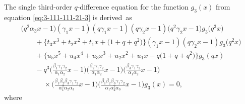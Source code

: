 \documentclass[pdftex]{sigma}
\numberwithin{equation}{section}
\theoremstyle{definition}
\begin{document}
The single third-order $q$-difference equation for the function $g_3(x)$ from equation \eqref{eq:3-111-111-21-3} is derived~as
\begin{gather}
\bigl(q^2 \alpha_3 x-1\bigr)(\gamma_1 x-1)(q \gamma_1 x-1)(q \gamma_2 x-1)\bigl(q^2 \gamma_2 x-1\bigr)g_3\bigl(q^3x\bigr) \nonumber \\
\qquad{}+ \bigl\{ t_3 x^3 + t_2 x^2 + t_1 x +\bigl(1+q+q^2\bigr) \bigr\} (\gamma_1 x-1)(q \gamma_2 x-1) g_3\bigl(q^2x\bigr) \nonumber \\
\qquad{}+ \bigl\{ u_5 x^5 + u_4 x^4 + u_3 x^3 + u_2 x^2 + u_1 x - q\bigl(1+q+q^2\bigr) \bigr\} g_3(qx) \nonumber \\
\qquad{}- q^3 \Biggl(\frac{\beta_1\gamma_1\gamma_2}{\alpha_1\alpha_2} x - 1 \Biggr) \Biggl(\frac{\beta_2\gamma_1\gamma_2}{\alpha_1\alpha_2} x - 1 \Biggr) \Biggl(\frac{\beta_3\gamma_1\gamma_2}{\alpha_1\alpha_2} x - 1 \Biggr) \nonumber \\
\phantom{\qquad-}{}\times \Biggl( \frac{\beta_1\beta_2\beta_3\gamma_1\gamma_2}{\alpha_1^2\alpha_2\alpha_3} x - 1 \Biggr) \Biggl( \frac{\beta_1\beta_2\beta_3\gamma_1\gamma_2}{\alpha_1\alpha_2^2\alpha_3} x - 1 \Biggr) g_3(x)=0, \label{eq:3-111-111-21-3-g3}
\end{gather}
where
\end{document}

